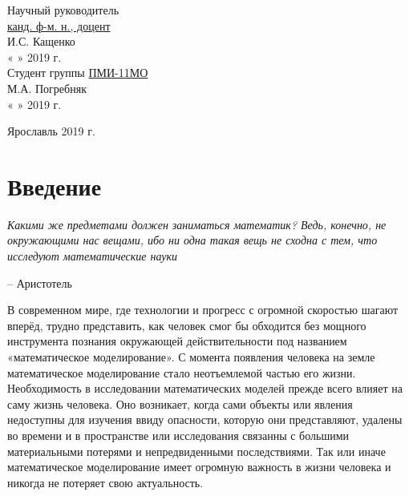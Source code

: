 \documentclass[12pt, a4paper]{extarticle}
\numberwithin{equation}{section}
\begin{document}
\begin{flushright} 
	Научный руководитель\\ 
	\underline{\phantom{aaa}канд. ф-м. н., доцент\phantom{aaa}}\\ 
	\vspace{0.1cm} 
	\underline{\phantom{aaaaaaaaaaaaa}} И.С. Кащенко\\ 
	« 
	\underline{\phantom{aaa}} 
	» 
	\underline{\phantom{aaaaaaaaaaaaa}} 2019 г.\\ 
	\vspace{0.5cm} 
	Студент группы \underline{\phantom{a}ПМИ-11МО\phantom{a}}\\ 
	\vspace{0.1cm} 
	\underline{\phantom{aaaaaaaaaaaaa}} М.А. Погребняк\\ 
	« 
	\underline{\phantom{aaa}} 
	» 
	\underline{\phantom{aaaaaaaaaaaaaa}}2019 г.\\ 
	\vspace{3cm}
\end{flushright} 
\begin{center} 
	Ярославль 2019 г.
	\vspace{-1cm}  
\end{center} 


\justify 
\setlength{\parindent}{1.25cm} 
\newpage 
\thispagestyle{empty} 
\setcounter{page}{2} 

\newpage

\setcounter{page}{2}

\tableofcontents 
\newpage 

\section*{Введение}
\epigraph{\textit{Какими же предметами должен заниматься математик? Ведь, конечно, не окружающими нас вещами, ибо ни одна такая вещь не сходна с тем, что исследуют математические науки}}
{-- Аристотель}
В современном мире, где технологии и прогресс с огромной скоростью шагают вперёд, трудно представить, как человек смог бы обходится без мощного инструмента познания окружающей действительности под названием «математическое моделирование». С момента появления человека на земле математическое моделирование стало неотъемлемой частью его жизни. Необходимость в исследовании математических моделей прежде всего влияет на саму жизнь человека. Оно возникает, когда сами объекты или явления недоступны для изучения ввиду опасности, которую они представляют, удалены во времени и в пространстве или исследования связанны с большими материальными потерями и непредвиденными последствиями. Так или иначе математическое моделирование имеет огромную важность в жизни человека и никогда не потеряет свою актуальность.
\end{document}
